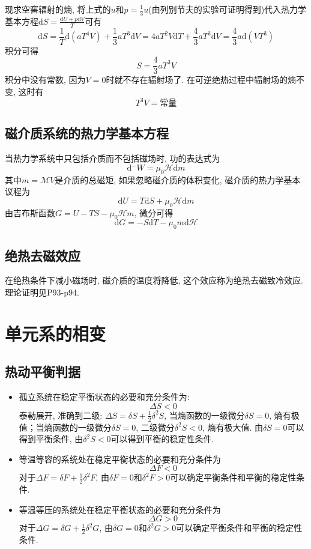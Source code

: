 现求空窖辐射的熵, 将上式的$u$和$p=\frac{1}{3}u$(由列别节夫的实验可证明得到)代入热力学基本方程$\mathrm{d}S=\frac{\mathrm{d}U+p\mathrm{d}V}{T}$可有
$$
    \mathrm{d}S=\frac{1}{T}\mathrm{d}(aT^4V)+\frac{1}{3}aT^3\mathrm{d}V=4aT^2V\mathrm{d}T+\frac{4}{3}aT^3\mathrm{d}V=\frac{4}{3}a\mathrm{d}(VT^3)
$$
积分可得
$$
    S=\frac{4}{3}aT^3V
$$
积分中没有常数, 因为$V=0$时就不存在辐射场了. 在可逆绝热过程中辐射场的熵不变, 这时有
$$
    T^3V=\mathrm{常量}
$$

\subsection{磁介质系统的热力学基本方程}
当热力学系统中只包括介质而不包括磁场时, 功的表达式为
$$
    \mathrm{d}\!\!\!^-W=\mu_0\mathcal{H}\mathrm{d}\mathit{m}
$$
其中$\mathit{m}=\mathcal{M}V$是介质的总磁矩, 如果忽略磁介质的体积变化, 磁介质的热力学基本议程为
$$
    \mathrm{d}U=T\mathrm{d}S+\mu_0\mathcal{H}\mathrm{d}\mathit{m}
$$
由吉布斯函数$G=U-TS-\mu_0\mathcal{H}\mathit{m}$, 微分可得
$$
    \mathrm{d}G=-S\mathrm{d}T-\mu_0\mathit{m}\mathrm{d}\mathcal{H}
$$

\subsection{绝热去磁效应}
在绝热条件下减小磁场时, 磁介质的温度将降低, 这个效应称为绝热去磁致冷效应. 理论证明见P93-p94.

\section{单元系的相变}
\subsection{热动平衡判据}
\begin{itemize}
    \item 孤立系统在稳定平衡状态的必要和充分条件为:
          $$\Delta S<0$$
          泰勒展开, 准确到二级: $\Delta S=\delta
              S+\frac{1}{2}\delta^2S$, 当熵函数的一级微分$\delta
              S=0$, 熵有极值；当熵函数的一级微分$\delta
              S=0$, 二级微分$\delta^2S<0$, 熵有极大值. 由$\delta
              S=0$可以得到平衡条件, 由$\delta^2S<0$可以得到平衡的稳定性条件.

    \item 等温等容的系统处在稳定平衡状态的必要和充分条件为
          $$
              \Delta F<0
          $$
          对于$\Delta F=\delta F+\frac{1}{2}\delta^2F$, 由$\delta
              F=0$和$\delta^2F>0$可以确定平衡条件和平衡的稳定性条件.
    \item 等温等压的系统处在稳定平衡状态的必要和充分条件为
          $$
              \Delta G>0
          $$
          对于$\Delta G=\delta G+\frac{1}{2}\delta^2G$, 由$\delta
              G=0$和$\delta^2G>0$可以确定平衡条件和平衡的稳定性条件.
\end{itemize}

